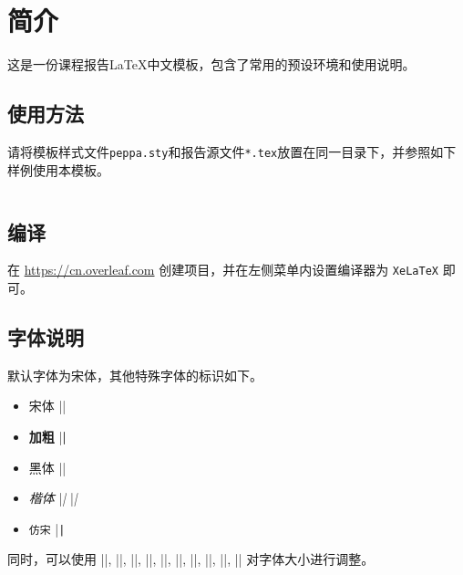 \section{简介}

这是一份课程报告\LaTeX 中文模板，包含了常用的预设环境和使用说明。

\subsection{使用方法}

请将模板样式文件\texttt{peppa.sty}和报告源文件\texttt{*.tex}放置在同一目录下，并参照如下样例使用本模板。

\inputminted{latex}{src/template-usage.tex}

\subsection{编译}
在 \url{https://cn.overleaf.com} 创建项目，并在左侧菜单内设置编译器为 \texttt{XeLaTeX} 即可。

\subsection{字体说明}
默认字体为宋体，其他特殊字体的标识如下。

\begin{itemize}
    \item \textrm{宋体} \latex|\textrm|
    \item \textbf{加粗} \latex|\textbf|
    \item \textsf{黑体} \latex|\textsf|
    \item \textit{楷体} \latex|\textit| \latex|\emph|
    \item \texttt{仿宋} \latex|\texttt|
\end{itemize}

同时，可以使用 \latex|\tiny|, \latex|\scriptsize|, \latex|\footnotesize|, \latex|\small|, \latex|\normalsize|, \latex|\large|, \latex|\Large|, \latex|\LARGE|, \latex|\huge|, \latex|\Huge| 对字体大小进行调整。